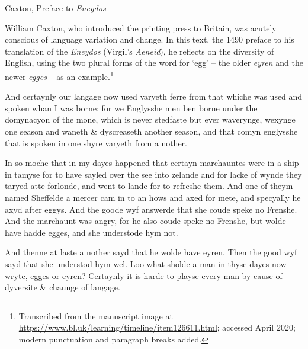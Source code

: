 \begin{texts}{Caxton, Preface to \emph{Eneydos}}\label{ME-Caxton}

William Caxton, who introduced the printing press to Britain, was acutely conscious of language variation and change. In this text, the 1490 preface to his translation of the \emph{Eneydos} (Virgil's \emph{Aeneid}), he reflects on the diversity of English, using the two plural forms of the word for `egg' -- the older \emph{eyren} and the newer \emph{egges} -- as an example.\footnote{Transcribed from the manuscript image at \url{https://www.bl.uk/learning/timeline/item126611.html}; accessed April 2020; modern punctuation and paragraph breaks added.}

\begin{textglossed}
  \internallinenumbers*{}
  And certaynly our langage now used varyeth ferre from that whiche was used and spoken whan I was borne: for we Englysshe men ben borne under the domynacyon of the mone, which is never stedfaste but ever waverynge, wexynge one season and waneth \& dyscreaseth another season, and that comyn englysshe that is spoken in one shyre varyeth from a nother.

  In so moche that in my dayes happened that certayn marchauntes were in a ship in tamyse for to have sayled over the see into zelande and for lacke of wynde they taryed atte forlonde, and went to lande for to refreshe them. And one of theym named Sheffelde a mercer cam in to an hows and axed for mete, and specyally he axyd after eggys. And the goode wyf answerde that she coude speke no Frenshe. And the marchaunt was angry, for he also coude speke no Frenshe, but wolde have hadde egges, and she understode hym not.

  And thenne at laste a nother sayd that he wolde have eyren. Then the good wyf sayd that she understod hym wel. Loo what sholde a man in thyse dayes now wryte, egges or eyren? Certaynly it is harde to playse every man by cause of dyversite \& chaunge of langage.
\end{textglossed}
\end{texts}

